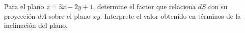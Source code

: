 Para el plano $z=3x-2y+1$, determine el factor que relaciona $dS$ con su proyección $dA$ sobre el plano $xy$. Interprete el valor obtenido en términos de la inclinación del plano.
